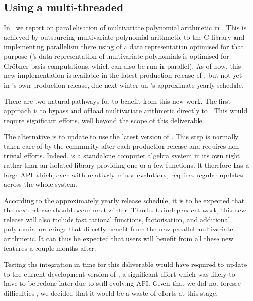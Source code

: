 \documentclass{deliverablereport}
\begin{document}
\subsection{Using a multi-threaded \Singular}

In~ we report on parallelisation of
multivariate polynomial arithmetic in \Singular. This is achieved by
outsourcing multivariate polynomial arithmetic to the C \FLINT library
and implementing parallelism there using of a data representation
optimised for that purpose (\Singular's data representation of
multivariate polynomials is optimised for Gr\"{o}bner basis
computations, which can also be run in parallel). As of now, this new
implementation is available in the latest production release of
\FLINT, but not yet in \Singular's own production release, due next
winter un \Singular's approximate yearly schedule.

There are two natural pathways for \Sage to benefit from this new
work. The first approach is to bypass \Singular and offload
multivariate arithmetic directly to \FLINT. This would require
significant efforts, well beyond the scope of this deliverable.

The alternative is to update \Sage to use the latest version of
\Singular. This step is normally taken care of by the community after
each production release \Singular and requires non trivial efforts.
Indeed, \Singular is a standalone computer algebra system in its own
right rather than an isolated library providing one or a few
functions. It therefore has a large API which, even with relatively
minor evolutions, requires regular updates across the whole \Sage
system.

According to the approximately yearly \Singular release schedule, it
is to be expected that the next release should occur next winter.
Thanks to independent work, this new release will also include fast
rational functions, factorisation, and additional polynomial orderings
that directly benefit from the new parallel multivariate arithmetic.
It can thus be expected that \Sage users will benefit from all these
new features a couple months after.

Testing the integration in time for this deliverable would have
required to update \Sage to the current development version of
\Singular; a significant effort which was likely to have to be redone
later due to still evolving API. Given that we did not foresee
difficulties , we decided that it
would be a waste of efforts at this stage.
\end{document}
